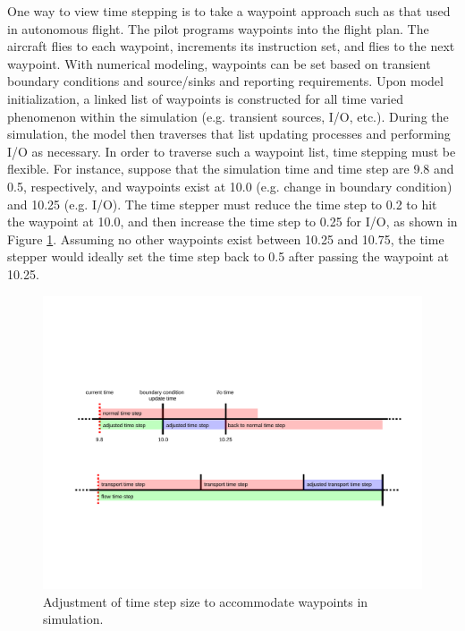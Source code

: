 \documentclass[12pt]{article}
\begin{document}
One way to view time stepping is to take a waypoint approach such as that used in autonomous flight.  The pilot programs waypoints into the flight plan.  The aircraft flies to each waypoint, increments its instruction set, and flies to the next waypoint. With numerical modeling, waypoints can be set based on transient boundary conditions and source/sinks and reporting requirements.  Upon model initialization, a linked list of waypoints is constructed for all time varied phenomenon within the simulation (e.g. transient sources, I/O, etc.).  During the simulation, the model then traverses that list updating processes and performing I/O as necessary. In order to traverse such a waypoint list, time stepping must be flexible.  For instance, suppose that the simulation time and time step are 9.8 and 0.5, respectively, and waypoints exist at 10.0 (e.g. change in boundary condition) and 10.25 (e.g. I/O).  The time stepper must reduce the time step to 0.2 to hit the waypoint at 10.0, and then increase the time step to 0.25 for I/O, as shown in Figure \ref{timeline}.  Assuming no other waypoints exist between 10.25 and 10.75, the time stepper would ideally set the time step back to 0.5 after passing the waypoint at 10.25.

\begin{figure}[h]\centering
\includegraphics[width=6.0in]{./figs/timeline}
\caption{Adjustment of time step size to accommodate waypoints in simulation.}\label{timeline}
\end{figure}
\end{document}
